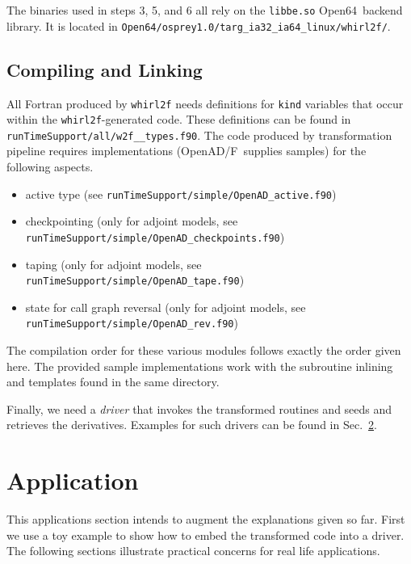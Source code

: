 \documentclass{book}
\newcommand{\OpenADF}{OpenAD/F}
\newcommand{\OpenSixtyFour}{Open64}
\newcommand{\code}[1]{{\small\tt{#1}}}
\newcommand{\refsec}[1]{{Sec.~\ref{#1}}}
\begin{document}
The binaries used in steps 3, 5, and 6 all rely on the \code{libbe.so} \OpenSixtyFour\ backend library. 
It is located in \code{Open64/osprey1.0/targ\_ia32\_ia64\_linux/whirl2f/}.
 
\section{Compiling and Linking}\label{sec:compLink}
All Fortran produced by \code{whirl2f} needs definitions for \code{kind} 
variables that occur within the \code{whirl2f}-generated code. 
These definitions can be found in \code{runTimeSupport/all/w2f\_\_types.f90}.
The code produced by  transformation pipeline 
requires  implementations 
(\OpenADF\ supplies samples) for the following aspects.
\begin{itemize}
\item active type (see \code{runTimeSupport/simple/OpenAD\_active.f90})
\item checkpointing (only  for adjoint models, see \code{runTimeSupport/simple/OpenAD\_checkpoints.f90})  
\item taping (only  for adjoint models, see \code{runTimeSupport/simple/OpenAD\_tape.f90})  
\item state for call graph reversal (only  for adjoint models, see \code{runTimeSupport/simple/OpenAD\_rev.f90})
\end{itemize}
The compilation order for these various modules follows exactly the order given here.
The provided sample implementations work with the subroutine inlining and templates found in the same 
directory.

Finally, we need a {\em driver} that invokes the transformed routines and seeds and retrieves the derivatives.
Examples for such drivers can be found in \refsec{chap:application}.

\chapter{Application}\label{chap:application}
This applications section intends to augment the explanations given so far. 
First we use a toy example to show how to embed the transformed code into 
a driver. The following sections illustrate practical concerns for real 
life applications. 
\end{document}
